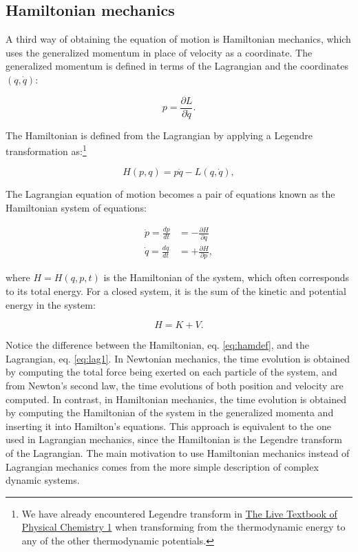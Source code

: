 \documentclass[
  9pt,
]{extbook}
\theoremstyle{definition}
\theoremstyle{definition}
\theoremstyle{definition}
\theoremstyle{remark}
\begin{document}
\hypertarget{hamiltonian-mechanics}{%
\subsection{Hamiltonian mechanics}\label{hamiltonian-mechanics}}

A third way of obtaining the equation of motion is Hamiltonian mechanics, which uses the generalized momentum in place of velocity as a coordinate. The generalized momentum is defined in terms of the Lagrangian and the coordinates \((q,\dot{q})\):

\begin{equation} 
p = \frac{\partial L}{\partial\dot{q}}.
\label{eq:ham1}
\end{equation}

The Hamiltonian is defined from the Lagrangian by applying a Legendre transformation as:\footnote{We have already encountered Legendre transform in \href{https://peverati.github.io/pchem1/Potentials.html\#thermpot}{The Live Textbook of Physical Chemistry 1} when transforming from the thermodynamic energy to any of the other thermodynamic potentials.}

\begin{equation} 
H(p,q) = p\dot{q} - L(q,\dot{q}),
\label{eq:ham2}
\end{equation}

The Lagrangian equation of motion becomes a pair of equations known as the Hamiltonian system of equations:

\begin{equation} 
\begin{aligned}
\dot{p}=\frac{dp}{dt} &= -\frac{\partial H}{\partial q} \\
\dot{q}=\frac{dq}{dt} &= +\frac{\partial H}{\partial p},
\end{aligned}
\label{eq:ham3}
\end{equation}

where \(H=H(q,p,t)\) is the Hamiltonian of the system, which often corresponds to its total energy. For a closed system, it is the sum of the kinetic and potential energy in the system:

\begin{equation}
H = K + V.
\label{eq:hamdef}
\end{equation}

Notice the difference between the Hamiltonian, eq. \eqref{eq:hamdef}, and the Lagrangian, eq. \eqref{eq:lag1}. In Newtonian mechanics, the time evolution is obtained by computing the total force being exerted on each particle of the system, and from Newton's second law, the time evolutions of both position and velocity are computed. In contrast, in Hamiltonian mechanics, the time evolution is obtained by computing the Hamiltonian of the system in the generalized momenta and inserting it into Hamilton's equations. This approach is equivalent to the one used in Lagrangian mechanics, since the Hamiltonian is the Legendre transform of the Lagrangian. The main motivation to use Hamiltonian mechanics instead of Lagrangian mechanics comes from the more simple description of complex dynamic systems.
\end{document}

